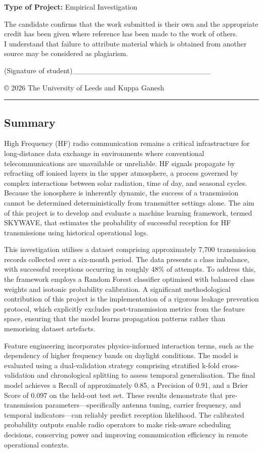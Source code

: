 \textbf{Type of Project:} Empirical Investigation

The candidate confirms that the work submitted is their own and the
appropriate credit has been given where reference has been made to the
work of others.\\
I understand that failure to attribute material which is obtained from
another source may be considered as plagiarism.

(Signature of
student)\_\_\_\_\_\_\_\_\_\_\_\_\_\_\_\_\_\_\_\_\_\_\_\_\_\_

© 2026 The University of Leeds and Kuppa Ganesh

\begin{center}\rule{0.5\linewidth}{0.5pt}\end{center}

\subsection{Summary}\label{summary}

High Frequency (HF) radio communication remains a critical
infrastructure for long-distance data exchange in environments where
conventional telecommunications are unavailable or unreliable. HF
signals propagate by refracting off ionised layers in the upper
atmosphere, a process governed by complex interactions between solar
radiation, time of day, and seasonal cycles. Because the ionosphere is
inherently dynamic, the success of a transmission cannot be determined
deterministically from transmitter settings alone. The aim of this
project is to develop and evaluate a machine learning framework, termed
SKYWAVE, that estimates the probability of successful reception for HF
transmissions using historical operational logs.

This investigation utilises a dataset comprising approximately 7,700
transmission records collected over a six-month period. The data
presents a class imbalance, with successful receptions occurring in
roughly 48\% of attempts. To address this, the framework employs a
Random Forest classifier optimised with balanced class weights and
isotonic probability calibration. A significant methodological
contribution of this project is the implementation of a rigorous leakage
prevention protocol, which explicitly excludes post-transmission metrics
from the feature space, ensuring that the model learns propagation
patterns rather than memorising dataset artefacts.

Feature engineering incorporates physics-informed interaction terms,
such as the dependency of higher frequency bands on daylight conditions.
The model is evaluated using a dual-validation strategy comprising
stratified k-fold cross-validation and chronological splitting to assess
temporal generalisation. The final model achieves a Recall of
approximately 0.85, a Precision of 0.91, and a Brier Score of 0.097 on
the held-out test set. These results demonstrate that pre-transmission
parameters---specifically antenna tuning, carrier frequency, and
temporal indicators---can reliably predict reception likelihood. The
calibrated probability outputs enable radio operators to make risk-aware
scheduling decisions, conserving power and improving communication
efficiency in remote operational contexts.

